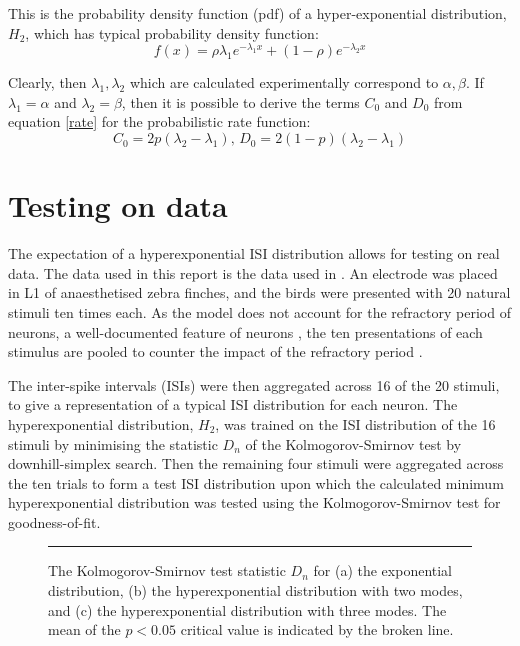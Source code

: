 This is the probability density function (pdf) of a hyper-exponential distribution, $H_2$, which has typical probability density function:
\begin{equation}
f(x) = \rho\lambda_1 e^{-\lambda_1 x} + (1-\rho) e^{-\lambda_2 x}
\end{equation}

Clearly, then $\lambda_1, \lambda_2$ which are calculated experimentally correspond to $\alpha,\beta$.  If $\lambda_1 = \alpha$ and $\lambda_2 = \beta$, then it is possible to derive the terms $C_0$ and $D_0$ from equation \ref{rate} for the probabilistic rate function:
\begin{equation}
C_0 = 2p(\lambda_2-\lambda_1), \, D_0 = 2(1-p)(\lambda_2-\lambda_1)
\end{equation}


\section{Testing on data}
The expectation of a hyperexponential ISI distribution allows for testing on real data.  The data used in this report is the data used in \citep{NarayanEtAl2006b}.  An electrode was placed in L1 of anaesthetised zebra finches, and the birds were presented with 20 natural stimuli ten times each.  As the model does not account for the refractory period of neurons, a well-documented feature of neurons \citep{OlshausenField2004a}, the ten presentations of each stimulus are pooled to counter the impact of the refractory period \citep{BerryMeister1998a}. 

The inter-spike intervals (ISIs) were then aggregated across 16 of the 20 stimuli, to give a representation of a typical ISI distribution for each neuron.  The hyperexponential distribution, $H_2$, was trained on the ISI distribution of the 16 stimuli by minimising the statistic $D_n$ of the Kolmogorov-Smirnov test \citep{Massey1951a} by downhill-simplex search.  Then the remaining four stimuli were aggregated across the ten trials to form a test ISI distribution upon which the calculated minimum hyperexponential distribution was tested using the Kolmogorov-Smirnov test for goodness-of-fit.

\begin{figure}

\bigskip
\rule{31.5em}{0.5pt}
\caption{\label{exphehe3} The Kolmogorov-Smirnov test statistic $D_n$ for (a) the exponential distribution, (b) the hyperexponential distribution with two modes, and (c) the hyperexponential distribution with three modes.  The mean of the $p<0.05$ critical value is indicated by the broken line.}
\end{figure}


